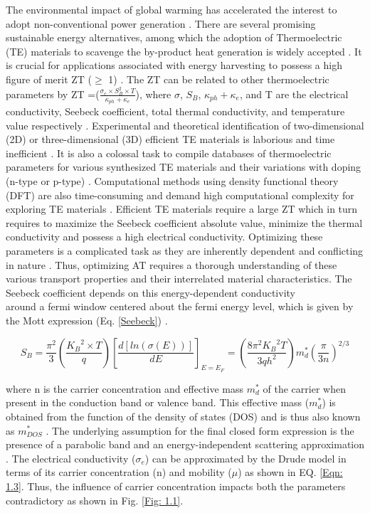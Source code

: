 \justify
\skipspace
The environmental impact of global warming has accelerated the interest to adopt non-conventional power generation \cite{EPFL}. There are several promising sustainable energy alternatives, among which the adoption of Thermoelectric (TE) materials to scavenge the by-product heat generation is widely accepted \cite{EPFL}. It is crucial for applications associated with energy harvesting to possess a high figure of merit ZT ($\geq$ 1) \cite{EPFL}.
\justify
\skipspace
The ZT can be related to other thermoelectric parameters by ZT =($\frac{\sigma_e \times S_B^2 \times T}{\kappa_{ph} + \kappa_e}$), where $\sigma$, $S_B$, $\kappa_{ph} + \kappa_{e}$, and T are the electrical conductivity, Seebeck coefficient, total thermal conductivity, and temperature value respectively \cite{EPFL}.
\justify
\skipspace
Experimental and theoretical identification of two-dimensional (2D) \cite{EPFL} or three-dimensional (3D) efficient TE materials is laborious and time inefficient \cite{EPFL}. It is also a colossal task to compile databases of thermoelectric parameters for various synthesized TE materials and their variations with doping (n-type or p-type) \cite{EPFL}. Computational methods using density functional theory (DFT) are also time-consuming and demand high computational complexity for exploring TE materials \cite{EPFL}.
\newpage
\justify
\skipspace
Efficient TE materials require a large ZT which in turn requires to maximize the Seebeck coefficient absolute value, minimize the thermal conductivity and possess a high electrical conductivity. Optimizing these parameters is a complicated task as they are inherently dependent and conflicting in nature \cite{EPFL}. Thus, optimizing AT requires a thorough understanding of these various transport properties and their interrelated material characteristics.
\justify
\skipspace
The Seebeck coefficient depends on this energy-dependent conductivity\\
around a fermi window centered about the fermi energy level,
which is given by the Mott expression (Eq. \ref{Seebeck}) \cite{EPFL}.

\begin{center}
    \begin{equation}
        S_B = \frac{\pi^2}{3}(\frac{{K_B}^2\times T}{q})[\frac{d[ln(\sigma (E))]}{dE}]_{E=E_F} = (\frac{8\pi^2{K_B}^2T}{3qh^2})m_d^*(\frac{\pi}{3n})^{2/3}
        \label{Seebeck}
    \end{equation}
\end{center}
\justify
\skipspace
where n is the carrier concentration and effective mass $m_d^*$ of the carrier when present in the conduction band or valence band. This effective mass ($m_d^*$) is obtained from the function of the density of states (DOS) and is thus also known as $m_{DOS}^*$ \cite{EPFL}. The underlying assumption for the final closed form expression is the presence of a parabolic band and an energy-independent scattering approximation \cite{EPFL}. The electrical conductivity ($\sigma_e$) can be approximated by the Drude model in terms of its carrier concentration (n) and mobility ($\mu$) as shown in EQ. \ref{Eqn: 1.3}. Thus, the influence of carrier concentration impacts both the parameters contradictory as shown in Fig. \ref{Fig: 1.1}.

